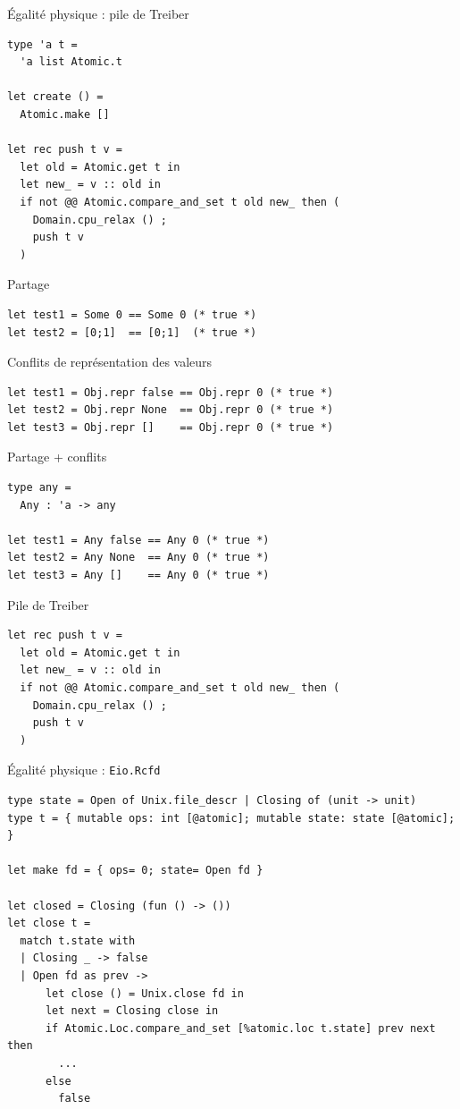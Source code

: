 \begin{frame}[fragile]{Égalité physique : pile de Treiber}
\large
\begin{verbatim}
type 'a t =
  'a list Atomic.t

let create () =
  Atomic.make []

let rec push t v =
  let old = Atomic.get t in
  let new_ = v :: old in
  if not @@ Atomic.compare_and_set t old new_ then (
    Domain.cpu_relax () ;
    push t v
  )
\end{verbatim}
\end{frame}

\begin{frame}[fragile]{Partage}
\Large
\begin{verbatim}
let test1 = Some 0 == Some 0 (* true *)
let test2 = [0;1]  == [0;1]  (* true *)
\end{verbatim}
\end{frame}

\begin{frame}[fragile]{Conflits de représentation des valeurs}
\Large
\begin{verbatim}
let test1 = Obj.repr false == Obj.repr 0 (* true *)
let test2 = Obj.repr None  == Obj.repr 0 (* true *)
let test3 = Obj.repr []    == Obj.repr 0 (* true *)
\end{verbatim}
\end{frame}

\begin{frame}[fragile]{Partage + conflits}
\Large
\begin{verbatim}
type any =
  Any : 'a -> any

let test1 = Any false == Any 0 (* true *)
let test2 = Any None  == Any 0 (* true *)
let test3 = Any []    == Any 0 (* true *)
\end{verbatim}
\end{frame}

\begin{frame}[fragile]{Pile de Treiber}
\Large
\begin{verbatim}
let rec push t v =
  let old = Atomic.get t in
  let new_ = v :: old in
  if not @@ Atomic.compare_and_set t old new_ then (
    Domain.cpu_relax () ;
    push t v
  )
\end{verbatim}
\end{frame}

\begin{frame}[fragile]{Égalité physique : \texttt{Eio.Rcfd}}
\begin{verbatim}
type state = Open of Unix.file_descr | Closing of (unit -> unit)
type t = { mutable ops: int [@atomic]; mutable state: state [@atomic]; }

let make fd = { ops= 0; state= Open fd }

let closed = Closing (fun () -> ())
let close t =
  match t.state with
  | Closing _ -> false
  | Open fd as prev ->
      let close () = Unix.close fd in
      let next = Closing close in
      if Atomic.Loc.compare_and_set [%atomic.loc t.state] prev next then
        ...
      else
        false
\end{verbatim}
\end{frame}

